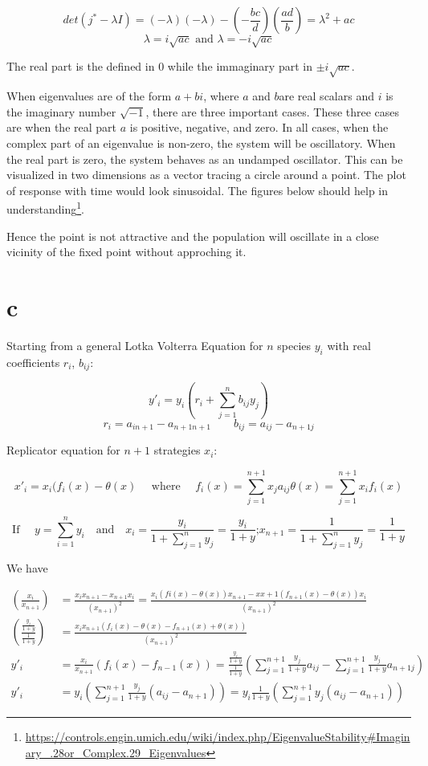 \[ det(j^*-\lambda I) = (-\lambda)(-\lambda) - (-\frac{bc}{d})(\frac{ad}{b}) = \lambda^2 +ac \]
\[ \lambda = i\sqrt{ac} \text{ and } \lambda = -i\sqrt{ac} \]

The real part is the defined in $0$ while the immaginary part in $\pm i \sqrt{ac}$.

When eigenvalues are of the form $a + bi$, where $a$ and $b$are real scalars and $i$ is the imaginary number $\sqrt{-1}$, there are three important cases. These three cases are when the real part $a$ is positive, negative, and zero. In all cases, when the complex part of an eigenvalue is non-zero, the system will be oscillatory. When the real part is zero, the system behaves as an undamped oscillator. This can be visualized in two dimensions as a vector tracing a circle around a point. The plot of response with time would look sinusoidal. The figures below should help in understanding\footnote{\url{https://controls.engin.umich.edu/wiki/index.php/EigenvalueStability\#Imaginary_.28or_Complex.29_Eigenvalues}}.

Hence the point is not attractive and the population will oscillate in a close vicinity of the fixed point without approching it. 

\section{c}

Starting from a general Lotka Volterra Equation for $n$ species $y_i$ with real coefficients $r_i$, $b_{ij}$:

\[  y'_i  = y_i(r_{i}+\sum\limits_{j=1}^{n} b_{ij}y_j)  \]
\[ r_i = a_{in+1} - a_{n+1n+1} \text{~~~~~~} b_{ij} = a_{ij} - a_{n+1j} \]


Replicator equation for $n+1$ strategies $x_i$:

\[ x'_i = x_i(f_i(x) - \theta (x) \text{~~~~where~~~~} f_i(x) = \sum\limits_{j=1}^{n+1} x_ja_{ij} \theta(x) = \sum\limits_{j=1}^{n+1} x_if_i(x)\]

\[ \text{If~~~~} y = \sum\limits_{i=1}^{n} y_i \text{~~~and~~~} x_i = \frac{y_i}{1+\sum\limits_{j=1}^{n} y_j} = \frac{y_i}{1+y} \text{;} x_{n+1} = \frac{1}{1+\sum\limits_{j=1}^{n}y_j} = \frac{1}{1+y}\]

We have

\begin{align*}
(\frac{x_i}{x_{n+1}}) &= \frac{x_ix_{n+1}-x_{n+1}x_i}{(x_{n+1})^2} = \frac{x_i(fi(x)-\theta(x))x_{n+1} -x{x+1}(f_{n+1}(x)-\theta(x))x_i}{(x_{n+1})^2}\\
\left(\frac{\frac{y_i}{1+y}}{\frac{1}{1+y}}\right) &= \frac{x_ix_{n+1}(f_i(x)-\theta(x)-f_{n+1}(x)+\theta(x))}{(x_{n+1})^2}\\
y'_i &= \frac{x_i}{x_{n+1}}(f_i(x)-f_{n-1}(x)) = \frac{\frac{y_i}{1+y}}{\frac{1}{1+y}}\left(\sum\limits_{j=1}^{n+1}\frac{y_j}{1+y}a_{ij} - \sum\limits_{j=1}^{n+1}\frac{y_j}{1+y}a_{n+1j}\right)\\
y'_i &= y_i \left( \sum\limits_{j=1}^{n+1}\frac{y_j}{1+y}(a_{ij}-a_{n+1}) \right) = y_i\frac{1}{1+y} \left( \sum\limits_{j=1}^{n+1} {y_j}(a_{ij}-a_{n+1}) \right)
\end{align*}

